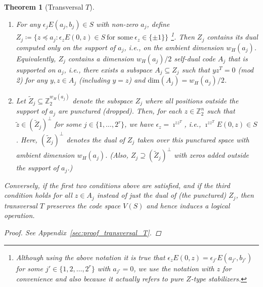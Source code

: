 \documentclass[twoside,romanappendices]{IEEEtran}
\newtheorem{theorem}{Theorem}
\begin{document}
\begin{theorem}[Transversal $T$]
\begin{enumerate}
\item  For any $\epsilon_j E(a_j,b_j) \in S$ with non-zero $a_j$, define $Z_j \coloneqq \{ z \preceq a_j \colon \epsilon_z E(0,z) \in S\ \text{for\ some}\ \epsilon_z \in \{ \pm 1 \} \}$%
	  \footnote{Although using the above notation it is true that $\epsilon_z E(0,z) = \epsilon_{j'} E(a_{j'},b_{j'})$ for some $j' \in \{ 1,2,\ldots,2^r \}$ with $a_{j'} = 0$, we use the notation with $z$ for convenience and also because it actually refers to pure $Z$-type stabilizers.}.
      Then $Z_j$ contains its dual computed only on the support of $a_j$, i.e., on the ambient dimension $w_H(a_j)$.
      Equivalently, $Z_j$ contains a dimension $w_H(a_j)/2$ self-dual code $A_j$ that is supported on $a_j$, i.e., there exists a subspace $A_j \subseteq Z_j$ such that $y z^T = 0$ (mod 2) for any $y,z \in A_j$ (including $y = z$) and $\text{dim}(A_j) = w_H(a_j)/2$.
      
\item Let $\tilde{Z}_j \subseteq \mathbb{Z}_2^{w_H(a_j)}$ denote the subspace $Z_j$ where all positions outside the support of $a_j$ are punctured (dropped).
      Then, for each $z \in \mathbb{Z}_2^n$ such that $\tilde{z} \in (\tilde{Z}_j)^{\perp}$ for some $j \in \{ 1,\ldots,2^r \}$, we have $\epsilon_z = \imath^{zz^T}$, i.e., $\imath^{zz^T} E(0,z) \in S$.
      Here, $(\tilde{Z}_j)^{\perp}$ denotes the dual of $Z_j$ taken over this punctured space with ambient dimension $w_H(a_j)$.
      (Also, $Z_j \supseteq (\tilde{Z}_j)^{\perp}$ with zeros added outside the support of $a_j$.)

\end{enumerate} 
Conversely, if the first two conditions above are satisfied, and if the third condition holds for all $z \in A_j$ instead of just the dual of (the punctured) $Z_j$, then transversal $T$ preserves the code space $V(S)$ and hence induces a logical operation.
\begin{proof}
See Appendix~\ref{sec:proof_transversal_T}.
\end{proof}
\end{theorem}
\end{document}
